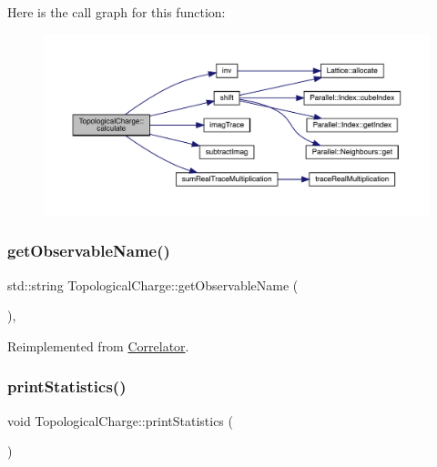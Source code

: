 Here is the call graph for this function\+:
\nopagebreak
\begin{figure}[H]
\begin{center}
\leavevmode
\includegraphics[width=350pt]{class_topological_charge_a8ed78c28c3484df04b1cb24187de2f5b_cgraph}
\end{center}
\end{figure}
\mbox{\label{class_topological_charge_ad12d246692f3d9ea0ef591814010ef88}} 
\subsubsection{\texorpdfstring{getObservableName()}{getObservableName()}}
{\footnotesize\ttfamily std\+::string Topological\+Charge\+::get\+Observable\+Name (\begin{DoxyParamCaption}{ }\end{DoxyParamCaption})\hspace{0.3cm}{\ttfamily [inline]}, {\ttfamily [virtual]}}



Reimplemented from \mbox{\hyperlink{class_correlator_ad1fa59e864917c3e48da037f90c3488f}{Correlator}}.

\mbox{\label{class_topological_charge_ad56263921d283d315b04ab40c9594a2c}} 
\subsubsection{\texorpdfstring{printStatistics()}{printStatistics()}}
{\footnotesize\ttfamily void Topological\+Charge\+::print\+Statistics (\begin{DoxyParamCaption}{ }\end{DoxyParamCaption})\hspace{0.3cm}{\ttfamily [virtual]}}



